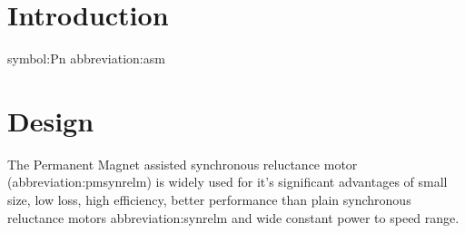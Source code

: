 \documentclass[a4paper, twoside, 11pt]{article}
\begin{document}


\newpage
{} %

\newpage




%

\null\newpage

\setcounter{page}{2}%

% 	


% 


\tableofcontents
\newpage%
\flushbottom %
\newpage
\vspace{0pt}

\listoffigures %
\flushbottom %
\newpage

\listoftables
\flushbottom

\newpage


\null\newpage

\setcounter{page}{1}

\section{Introduction}
\gls{symbol:Pn} \gls{abbreviation:asm}

\section{Design}
The Permanent Magnet assisted synchronous reluctance motor (\gls{abbreviation:pmsynrelm}) is widely used for it's significant advantages of small size, low loss, high efficiency, better performance than plain synchronous reluctance motors \gls{abbreviation:synrelm} and wide constant power to speed range. \cite{xinmin-design-of-permanent-magnet-assisted-synch-rel-m-with-low-torque-ripple,huynh-design-and-analysis-of-perm-as-synch-rel-m}
\end{document}
